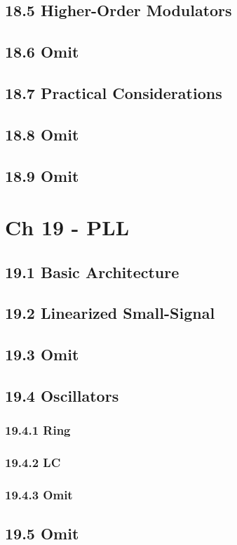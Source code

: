 \documentclass[a4paper,twocolumn]{article}
\begin{document}
    \subsection{18.5 Higher-Order Modulators}
    \subsection{18.6 Omit}
    \subsection{18.7 Practical Considerations}
    \subsection{18.8 Omit}
    \subsection{18.9 Omit}
  \section{Ch 19 - PLL}
    \subsection{19.1 Basic Architecture}
    \subsection{19.2 Linearized Small-Signal}
    \subsection{19.3 Omit}
    \subsection{19.4 Oscillators}
      \subsubsection{19.4.1 Ring}
      \subsubsection{19.4.2 LC}
      \subsubsection{19.4.3 Omit}
    \subsection{19.5 Omit}
\end{document}
